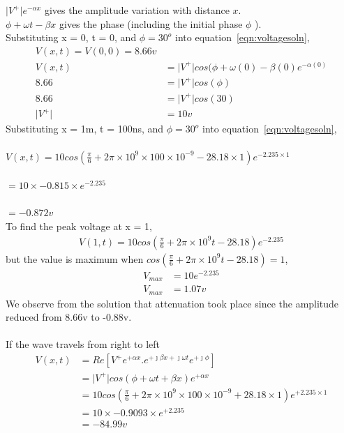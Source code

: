\begin{exmp}
$\lvert V^+\rvert e^{-\alpha x} $ gives the amplitude variation with distance $ x $. \\
$ \phi + \omega t - \beta x $ gives the phase (including the initial phase $ \phi $ ).\\

Substituting x = 0, t = 0, and $\phi = 30^o$ into equation~\ref{eqn:voltagesoln},
\begin{align*}
V(x,t) = V(0,0) = 8.66v \\
V(x,t) &= \lvert V^+\rvert cos(\phi + \omega (0) - \beta (0)e^{-\alpha (0)}\\
8.66 &= \lvert V^+\rvert cos(\phi)\\
8.66 &= \lvert V^+\rvert cos(30)\\
\lvert V^+\rvert &= 10v
\end{align*}
Substituting x = 1m, t = 100ns, and $\phi = 30^o$ into equation~\ref{eqn:voltagesoln},\\\\
$ V(x,t) = 10 cos(\frac{\pi}{6} + 2\pi \times 10^9\times 100\times 10^{-9} - 28.18\times 1)e^{-2.235\times 1} $\\\\
$ = 10 \times -0.815 \times e^{-2.235} $\\\\
$ = -0.872v $\\
To find the peak voltage at x = 1,
\begin{align*}
V(1,t) = 10cos(\frac{\pi}{6} + 2\pi \times 10^9t - 28.18)e^{-2.235}
\end{align*}
but the value is maximum when $cos(\frac{\pi}{6} + 2\pi \times 10^9t - 28.18) = 1$, 
\begin{align*}
V_{max} &= 10e^{-2.235}\\
V_{max} &= 1.07v
\end{align*}
We observe from the solution that attenuation took place since the amplitude reduced from 8.66v to -0.88v.\\ \\
If the wave travels from right to left
\begin{align*}
V(x,t) &= Re{[V^+ e^{+\alpha x}.e^{+\jmath\beta x + \jmath\omega t}e^{+\jmath\phi}]}\\
&= \lvert V^+\rvert cos(\phi + \omega t + \beta x)e^{+\alpha x}\\
&= 10 cos(\frac{\pi}{6} + 2\pi \times 10^9\times 100\times 10^{-9} + 28.18\times 1)e^{+2.235\times 1}\\
&= 10 \times -0.9093 \times e^{+2.235}\\
&= -84.99v
\end{align*} 	
\end{exmp}

